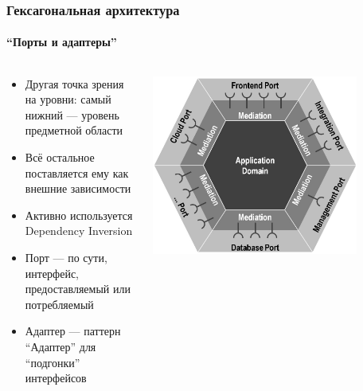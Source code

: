 \documentclass{../cscslides}
\begin{document}
    \begin{frame}
        \frametitle{Гексагональная архитектура}
        \framesubtitle{``Порты и адаптеры''}
        \begin{columns}
            \begin{column}{0.5\textwidth}
                \begin{itemize}
                    \item Другая точка зрения на уровни: самый нижний --- уровень предметной области
                    \item Всё остальное поставляется ему как внешние зависимости
                    \item Активно используется Dependency Inversion
                    \item Порт --- по сути, интерфейс, предоставляемый или потребляемый
                    \item Адаптер --- паттерн ``Адаптер'' для ``подгонки'' интерфейсов
                \end{itemize}
            \end{column}
            \begin{column}{0.5\textwidth}
                \begin{center}
                    \includegraphics[width=0.8\textwidth]{hexagonalArchitecture.png}
                \end{center}
            \end{column}
        \end{columns}
    \end{frame}
\end{document}
